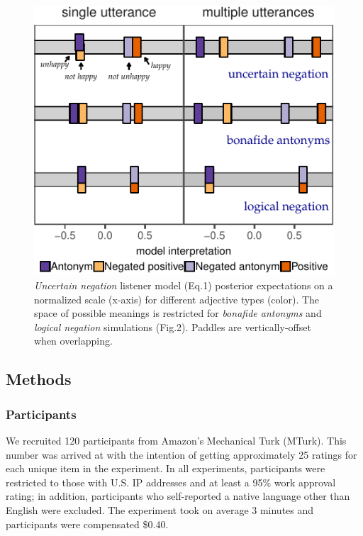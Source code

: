 \documentclass[floatsintext,doc]{apa6}
\begin{document}
\begin{figure}[t]
\centering \includegraphics{figs/modelPredictions-1} 
\caption{ \emph{Uncertain negation} listener model (Eq.1) posterior expectations on a normalized scale (x-axis) for different adjective types (color). The space of possible meanings is restricted for \emph{bonafide antonyms} and \emph{logical negation} simulations (Fig.2). Paddles are vertically-offset when overlapping.}\label{fig:modelPredictions}
\end{figure}


\subsection{Methods}
\subsubsection{Participants}\label{participants}%

We recruited 120 participants from Amazon's Mechanical Turk (MTurk).
This number was arrived at with the intention of getting approximately 25 ratings for each unique item in the experiment.
In all experiments, participants were restricted to those with U.S. IP addresses and at least a 95\% work approval rating; in addition, participants who self-reported a native language other than English were excluded.
The experiment took on average 3 minutes and participants were compensated \$0.40.
\end{document}
